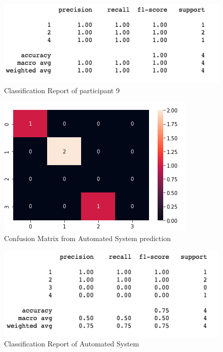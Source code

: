\begin{figure}[!htp]
    \includegraphics[width=\textwidth]{Images/p9r.png}
    \caption{Classification Report of participant 9}
    \label{fig:f11}
\end{figure}

\pagebreak

\begin{figure}[!htp]
    \includegraphics[width=\textwidth]{Images/a9.png}
    \caption{Confusion Matrix from Automated System prediction}
    \label{fig:f11}
\end{figure}

\begin{figure}[!htp]
    \includegraphics[width=\textwidth]{Images/a9r.png}
    \caption{Classification Report of Automated System}
    \label{fig:f11}
\end{figure}


